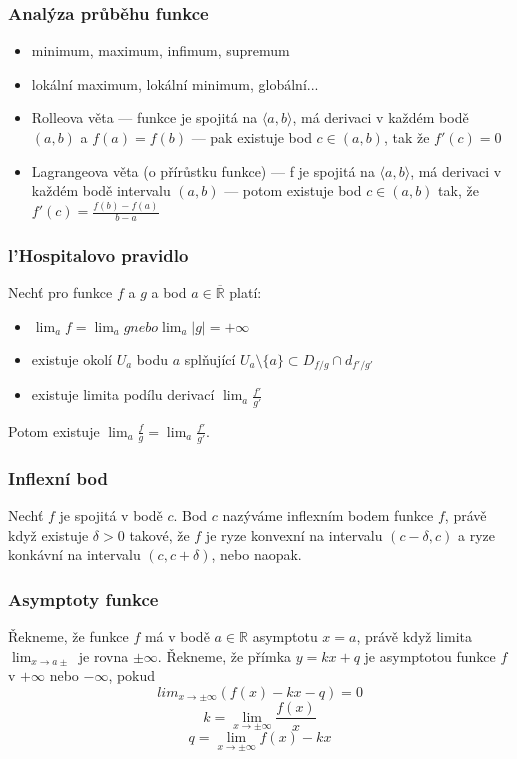 \subsubsection*{Analýza průběhu funkce}
\begin{itemize}
	\item minimum, maximum, infimum, supremum
	\item lokální maximum, lokální minimum, globální...
	\item Rolleova věta --- funkce je spojitá na $\langle a,b\rangle$, má derivaci v každém bodě $(a,b)$ a $f(a) = f(b)$ --- pak existuje bod $c \in (a,b)$, tak že $f'(c) = 0$
	\item Lagrangeova věta (o přírůstku funkce) --- f je spojitá na $\langle a,b\rangle$, má derivaci v každém bodě intervalu $(a,b)$ --- potom existuje bod $c \in (a, b)$ tak, že $f'(c) = \frac{f(b) - f(a)}{b - a}$
\end{itemize}

\subsubsection*{l'Hospitalovo pravidlo}
Nechť pro funkce $f$ a $g$ a bod $a \in \overline{\mathbb{R}}$ platí:
\begin{itemize}
	\item $\lim_a f = \lim_a g nebo \lim_a |g| = +\infty$
	\item existuje okolí $U_a$ bodu $a$ splňující $U_a \setminus \{a\} \subset D_{f/g} \cap d_{f'/g'}$
	\item existuje limita podílu derivací $\lim_a \frac{f'}{g'}$
\end{itemize}
Potom existuje $\lim_a \frac{f}{g} = \lim_a \frac{f'}{g'}$.

\subsubsection*{Inflexní bod}
Nechť $f$ je spojitá  v bodě $c$. Bod $c$ nazýváme inflexním bodem funkce $f$, právě když existuje $\delta > 0$ takové, že $f$ je ryze konvexní na intervalu $(c - \delta, c)$ a ryze konkávní na intervalu $(c, c + \delta)$, nebo naopak.

\subsubsection*{Asymptoty funkce}
Řekneme, že funkce $f$ má v bodě $a \in \mathbb{R}$ asymptotu $x = a$, právě když limita $\lim_{x\to a\pm}$ je rovna $\pm \infty$. Řekneme, že přímka $y = kx + q$ je asymptotou funkce $f$ v $+\infty$ nebo $-\infty$, pokud $$lim_{x\to\pm\infty} (f(x) - kx - q) = 0$$
$$k = \lim_{x\to\pm\infty} \frac{f(x)}{x}$$
$$q = \lim_{x\to\pm\infty} f(x) - kx$$